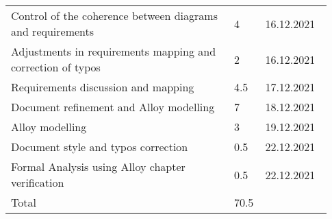 \begin{longtable}{@{}p{0.67\linewidth} p{0.06\linewidth} p{0.20\linewidth}@{}}
    Control of the coherence between diagrams and requirements & 4 & 16.12.2021\\
    Adjustments in requirements mapping and correction of typos & 2 & 16.12.2021\\
    Requirements discussion and mapping & 4.5 & 17.12.2021\\
    Document refinement and Alloy modelling & 7 & 18.12.2021\\
    Alloy modelling & 3 & 19.12.2021\\
    Document style and typos correction & 0.5 & 22.12.2021\\
    Formal Analysis using Alloy chapter verification & 0.5 & 22.12.2021\\
    \hline
    Total & 70.5 &\\ 
    \bottomrule[1.5pt]
\end{longtable}


